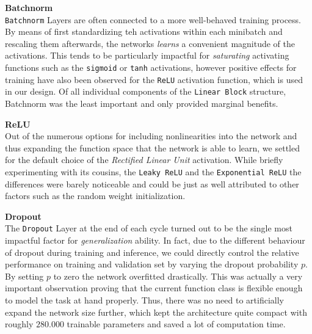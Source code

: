 \documentclass[12pt, letterpaper]{article}
\begin{document}
\textbf{Batchnorm} \\
\texttt{Batchnorm} Layers are often connected to a more well-behaved training process.
By means of first standardizing teh activations within each minibatch and rescaling them afterwards, the networks \emph{learns} a convenient magnitude of the activations.
This tends to be particularly impactful for \emph{saturating} activating functions such as the \texttt{sigmoid} or \texttt{tanh} activations, however positive effects for training have also been observed for the \texttt{ReLU} activation function, which is used in our design.
Of all individual components of the \texttt{Linear Block} structure, Batchnorm was the least important and only provided marginal benefits.

\textbf{ReLU} \\
Out of the numerous options for including nonlinearities into the network and thus expanding the function space that the network is able to learn, we settled for the default choice of the \emph{Rectified Linear Unit} activation.
While briefly experimenting with its cousins, the \texttt{Leaky ReLU} and the \texttt{Exponential ReLU} the differences were barely noticeable and could be just as well attributed to other factors such as the random weight initialization.

\textbf{Dropout} \\
The \texttt{Dropout} Layer at the end of each cycle turned out to be the single most impactful factor for \emph{generalization} ability.
In fact, due to the different behaviour of dropout during training and inference, we could directly control the relative performance on training and validation set by varying the dropout probability $p$.
By setting $p$ to zero the network overfitted drastically.
This was actually a very important observation proving that the current function class is flexible enough to model the task at hand properly.
Thus, there was no need to artificially expand the network size further, which kept the architecture quite compact with roughly $280.000$ trainable parameters and saved a lot of computation time.
\end{document}
